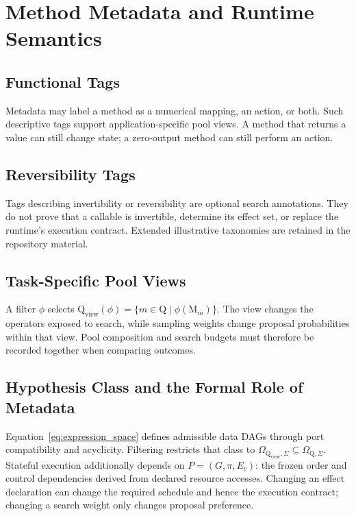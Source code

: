 \section{Method Metadata and Runtime Semantics}
\label{app:method-pool-semantics}
\subsection{Functional Tags}
Metadata may label a method as a numerical mapping, an action, or both. Such
descriptive tags support application-specific pool views. A method that returns
a value can still change state; a zero-output method can still perform an action.

\subsection{Reversibility Tags}
Tags describing invertibility or reversibility are optional search annotations.
They do not prove that a callable is invertible, determine its effect set, or
replace the runtime's execution contract. Extended illustrative taxonomies are
retained in the repository material.

\subsection{Task-Specific Pool Views}
A filter $\phi$ selects
$\mathrm{Q}_{\mathrm{view}}(\phi)=\{m\in\mathrm Q\mid\phi(\mathrm M_m)\}$.
The view changes the operators exposed to search, while sampling weights change
proposal probabilities within that view. Pool composition and search budgets
must therefore be recorded together when comparing outcomes.

\subsection{Hypothesis Class and the Formal Role of Metadata}
\label{app:metadata_role}
Equation~\ref{eq:expression_space} defines admissible data DAGs through port
compatibility and acyclicity. Filtering restricts that class to
$\Omega_{\mathrm{Q}_{\mathrm{view}},\Sigma}\subseteq\Omega_{\mathrm Q,\Sigma}$.
Stateful execution additionally depends on $P=(G,\pi,E_c)$: the frozen order
and control dependencies derived from declared resource accesses. Changing an
effect declaration can change the required schedule and hence the execution
contract; changing a search weight only changes proposal preference.

